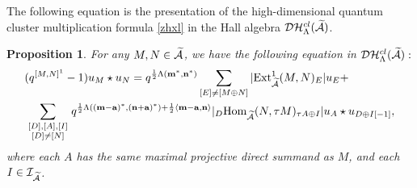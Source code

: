 \documentclass[reqno,12pt]{amsart}
\numberwithin{equation}{section}
\def\Ext{\mbox{\rm Ext}} \def\Hom{\mbox{\rm Hom}} \def\dim{\mbox{\rm dim}} \def\Iso{\mbox{\rm Iso}\,}\def\Ind{\mbox{\rm Ind}\,}
\def\lr#1{\langle #1\rangle} \def\fin{\hfill$\square$}  \def\lra{\longrightarrow} \def\mod{\mbox{\rm \textbf{mod}}\,}\def\Mod{\mbox{\rm mod}\,}\def\top{\mbox{\rm top}\,}\def\soc{\mbox{\rm soc}\,}
\theoremstyle{plain} %
\newtheorem{proposition}[theorem]{\bf Proposition}
\theoremstyle{definition} %
\begin{document}
The following equation is the presentation of the high-dimensional quantum cluster multiplication formula \eqref{zhxl} in the Hall algebra $\mathcal {D}\mathcal {H}_\Lambda^{{cl}}(\widetilde{\mathcal{A}})$.
\begin{proposition}\label{hccfgs}
For any $M,N\in\widetilde{\mathcal{A}}$, we have the following equation in $\mathcal {D}\mathcal {H}_\Lambda^{{cl}}(\widetilde{\mathcal{A}}):$
\begin{equation}
\begin{split}
&(q^{[M,N]^1}-1)u_M\star u_N=q^{\frac{1}{2}\Lambda({\bf m}^*,{\bf n}^*)}\sum\limits_{[E]\neq [M\oplus N]}
|\Ext_{\widetilde{\A}}^1(M,N)_E|u_E+\\&\sum\limits_{\begin{smallmatrix}[D],[A],[I]\\ [D]\neq [N]\end{smallmatrix}}q^{\frac{1}{2}\Lambda(({\bf m}-{{\bf a}})^*,{({\bf n}+{\bf a})}^*)+\frac{1}{2}\lr{{{\bf m}}-{{\bf a}},{\bf n}}}|_D\Hom_{\widetilde{\A}}(N,\tau M)_{\tau A\oplus I}|u_{A}\star u_{D\oplus I[-1]},
\end{split}\end{equation}
where each $A$ has the same maximal projective direct summand as $M$, and each $I\in\mathcal{I}_{\widetilde{\mathcal{A}}}$.
\end{proposition}
\end{document}
